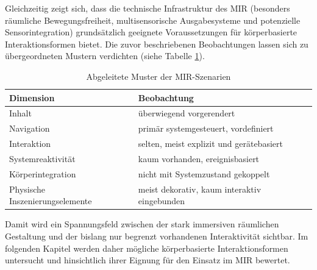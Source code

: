 Gleichzeitig zeigt sich, dass die technische Infrastruktur des MIR (besonders räumliche Bewegungsfreiheit, multisensorische Ausgabesysteme und potenzielle Sensorintegration) grund\-sätzlich geeignete Voraussetzungen für körper\-basierte Interaktionsformen bietet.
Die zuvor beschriebenen Beobachtungen lassen sich zu übergeordneten Mustern verdichten (siehe Tabelle \ref{tab:muster}).

\begin{table}[htbp]
\centering
\small
\caption{Abgeleitete Muster der MIR-Szenarien}
\begin{tabular}{>{\raggedright\arraybackslash}p{5cm} >{\raggedright\arraybackslash}p{7cm}}
\toprule
\textbf{Dimension} & \textbf{Beobachtung} \\
\toprule
Inhalt & überwiegend vorgerendert \\
\midrule
Navigation & primär systemgesteuert, vordefiniert \\
\midrule
Interaktion & selten, meist explizit und gerätebasiert \\
\midrule
Systemreaktivität & kaum vorhanden, ereignisbasiert \\ %
\midrule
Körperintegration & nicht mit Systemzustand gekoppelt \\
\midrule
Physische Inszenierungselemente & meist dekorativ, kaum interaktiv eingebunden \\
\bottomrule
\end{tabular}
\label{tab:muster}
\end{table}

Damit wird ein Spannungsfeld zwischen der stark immersiven räumlichen Gestaltung und der bislang nur begrenzt vorhandenen Interaktivität sichtbar.
Im folgenden Kapitel werden daher mögliche körper\-basierte Interaktionsformen untersucht und hinsichtlich ihrer Eignung für den Einsatz im MIR bewertet.